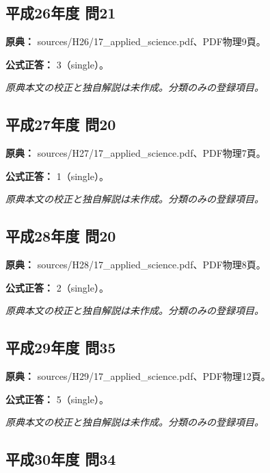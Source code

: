 \subsection{平成26年度 問21}
\label{q:h26-reg-applied-21}

\noindent\textbf{原典：} sources/H26/17\_applied\_science.pdf、PDF物理9頁。

\textbf{公式正答：} 3（single）。

\par\textit{原典本文の校正と独自解説は未作成。分類のみの登録項目。}

\subsection{平成27年度 問20}
\label{q:h27-reg-applied-20}

\noindent\textbf{原典：} sources/H27/17\_applied\_science.pdf、PDF物理7頁。

\textbf{公式正答：} 1（single）。

\par\textit{原典本文の校正と独自解説は未作成。分類のみの登録項目。}

\subsection{平成28年度 問20}
\label{q:h28-reg-applied-20}

\noindent\textbf{原典：} sources/H28/17\_applied\_science.pdf、PDF物理8頁。

\textbf{公式正答：} 2（single）。

\par\textit{原典本文の校正と独自解説は未作成。分類のみの登録項目。}

\subsection{平成29年度 問35}
\label{q:h29-reg-applied-35}

\noindent\textbf{原典：} sources/H29/17\_applied\_science.pdf、PDF物理12頁。

\textbf{公式正答：} 5（single）。

\par\textit{原典本文の校正と独自解説は未作成。分類のみの登録項目。}

\subsection{平成30年度 問34}
\label{q:h30-reg-applied-34}

